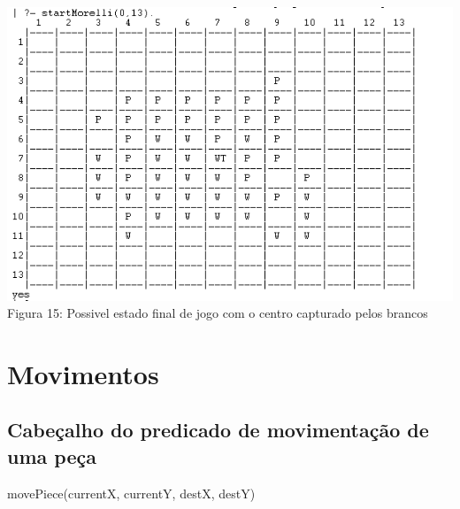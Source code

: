 \documentclass[a4paper]{article}
\begin{document}
\begin{center}
 \includegraphics[scale=0.9]{gameex3.png}\linebreak
Figura 15: Possivel estado final de jogo com o centro capturado pelos brancos \linebreak\linebreak
\end{center}


\newpage
\section{Movimentos}
\subsection{Cabeçalho do predicado de movimentação de uma peça}
movePiece(currentX, currentY, destX, destY)
\end{document}
